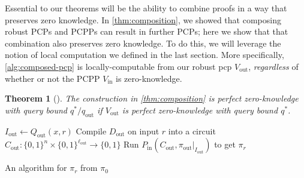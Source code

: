\documentclass[english,12pt]{reedthesis}
\theoremstyle{plain}
\newtheorem{thm}{Theorem}[section]
\theoremstyle{definition}
\theoremstyle{remark}
\DeclareMathOperator{\out}{out}
\DeclareMathOperator{\oin}{in}
\begin{document}
Essential to our theorems will be the ability to combine proofs in a way that
preserves zero knowledge. In \cref{thm:composition}, we showed that composing
robust PCPs and PCPPs can result in further PCPs; here we show that that
combination also preserves zero knowledge. To do this, we will leverage the
notion of local computation we defined in the last section. More specifically,
\cref{alg:composed-pcp} is locally-computable from our robust pcp $V_{\out}$,
\emph{regardless} of whether or not the PCPP $V_{\oin}$ is zero-knowledge.

\begin{thm}[{\cite[Theorem 3.7]{GOS25}}]\label{thm:comp-pzk}
  The construction in \cref{thm:composition} is perfect zero-knowledge with
  query bound $q^{*}/q_{\out}$ if $V_{\out}$ is perfect zero-knowledge with
  query bound $q^{*}$.
\end{thm}

\begin{algorithm}[htbp]
  \KwIn{A string $r \in \{0, 1\}^{r_{\out}}$}
  $I_{\out} \leftarrow Q_{\out}(x, r)$\;
  Compile $D_{\out}$ on input $r$ into a circuit
  $C_{\out}\colon \{0, 1\}^{n} \times \{0, 1\}^{\ell_{\out}} \rightarrow \{0, 1\}$\;
  Run $P_{\oin}(C_{\out}, \pi_{\out}|_{I_{\out}})$ to get $\pi_{r}$\;
  \;
  \caption{An algorithm for $\pi_{r}$ from $\pi_{0}$}\label{alg:pi-r-from-pi-0}
\end{algorithm}
\end{document}

